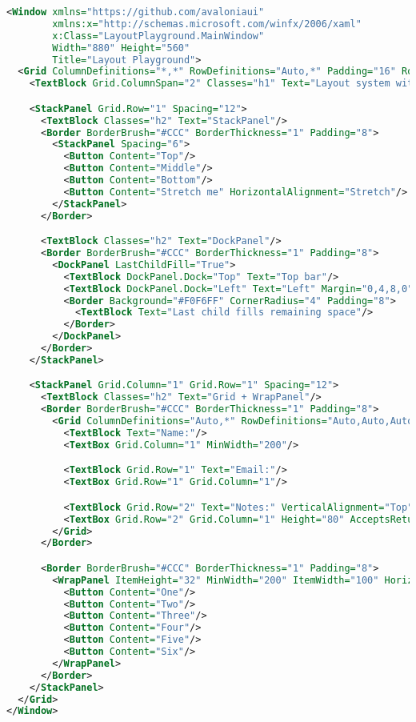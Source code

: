 \begin{lstlisting}[language=XML]
<Window xmlns="https://github.com/avaloniaui"
        xmlns:x="http://schemas.microsoft.com/winfx/2006/xaml"
        x:Class="LayoutPlayground.MainWindow"
        Width="880" Height="560"
        Title="Layout Playground">
  <Grid ColumnDefinitions="*,*" RowDefinitions="Auto,*" Padding="16" RowSpacing="16" ColumnSpacing="16">
    <TextBlock Grid.ColumnSpan="2" Classes="h1" Text="Layout system without mystery"/>

    <StackPanel Grid.Row="1" Spacing="12">
      <TextBlock Classes="h2" Text="StackPanel"/>
      <Border BorderBrush="#CCC" BorderThickness="1" Padding="8">
        <StackPanel Spacing="6">
          <Button Content="Top"/>
          <Button Content="Middle"/>
          <Button Content="Bottom"/>
          <Button Content="Stretch me" HorizontalAlignment="Stretch"/>
        </StackPanel>
      </Border>

      <TextBlock Classes="h2" Text="DockPanel"/>
      <Border BorderBrush="#CCC" BorderThickness="1" Padding="8">
        <DockPanel LastChildFill="True">
          <TextBlock DockPanel.Dock="Top" Text="Top bar"/>
          <TextBlock DockPanel.Dock="Left" Text="Left" Margin="0,4,8,0"/>
          <Border Background="#F0F6FF" CornerRadius="4" Padding="8">
            <TextBlock Text="Last child fills remaining space"/>
          </Border>
        </DockPanel>
      </Border>
    </StackPanel>

    <StackPanel Grid.Column="1" Grid.Row="1" Spacing="12">
      <TextBlock Classes="h2" Text="Grid + WrapPanel"/>
      <Border BorderBrush="#CCC" BorderThickness="1" Padding="8">
        <Grid ColumnDefinitions="Auto,*" RowDefinitions="Auto,Auto,Auto" ColumnSpacing="8" RowSpacing="8">
          <TextBlock Text="Name:"/>
          <TextBox Grid.Column="1" MinWidth="200"/>

          <TextBlock Grid.Row="1" Text="Email:"/>
          <TextBox Grid.Row="1" Grid.Column="1"/>

          <TextBlock Grid.Row="2" Text="Notes:" VerticalAlignment="Top"/>
          <TextBox Grid.Row="2" Grid.Column="1" Height="80" AcceptsReturn="True" TextWrapping="Wrap"/>
        </Grid>
      </Border>

      <Border BorderBrush="#CCC" BorderThickness="1" Padding="8">
        <WrapPanel ItemHeight="32" MinWidth="200" ItemWidth="100" HorizontalAlignment="Left">
          <Button Content="One"/>
          <Button Content="Two"/>
          <Button Content="Three"/>
          <Button Content="Four"/>
          <Button Content="Five"/>
          <Button Content="Six"/>
        </WrapPanel>
      </Border>
    </StackPanel>
  </Grid>
</Window>
\end{lstlisting}

